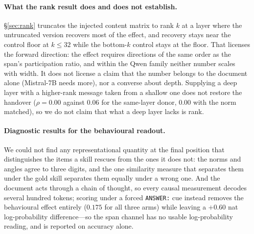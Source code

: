 \documentclass{article}
\begin{document}
\paragraph{What the rank result does and does not establish.}
\S\ref{sec:rank} truncates the injected content matrix to rank $k$ at a layer
where the untruncated version recovers most of the effect, and recovery stays near the control floor at $k \le 32$ while the bottom-$k$ control stays at the floor. That
licenses the forward direction: the effect requires directions of the same order
as the span's participation ratio, and within the Qwen family neither number
scales with width. It does not license a claim that the number belongs to the
document alone (Mistral-7B needs more), nor a converse about depth. Supplying a deep layer
with a higher-rank message taken from a shallow one does not restore the
handover ($\rho=0.00$ against $0.06$ for the same-layer donor, $0.00$ with the
norm matched), so we do not claim that what a deep layer lacks is rank.

\paragraph{Diagnostic results for the behavioural readout.} We could not find any
representational quantity at the final position that distinguishes the items a
skill rescues from the ones it does not: the norms and angles agree to three
digits, and the one similarity measure that separates them under the gold skill
separates them equally under a wrong one. And the document acts through a chain
of thought, so every causal measurement decodes several hundred tokens; scoring
under a forced \texttt{ANSWER:} cue instead removes the behavioural effect
entirely ($0.175$ for all three arms) while leaving a $+0.60$ nat
log-probability difference---so the span channel has no usable log-probability
reading, and is reported on accuracy alone.
\end{document}
